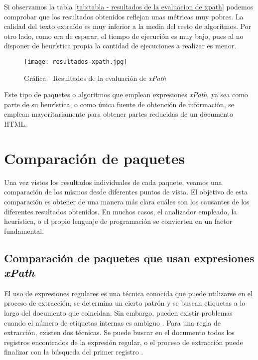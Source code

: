 Si observamos la tabla \ref{tab:tabla - resultados de la evaluacion de xpath} podemos comprobar que los
resultados obtenidos reflejan unas métricas muy pobres. La calidad del texto extraído es muy inferior a la
media del resto de algoritmos. Por otro lado, como era de esperar, el tiempo de ejecución es muy bajo, pues
al no disponer de heurística propia la cantidad de ejecuciones a realizar es menor.

\begin{figure}[tphb]
    \centering
    \texttt{[image: resultados-xpath.jpg]}
    \caption{Gráfica - Resultados de la evaluación de \emph{xPath}}
    \label{img:grafica - resultados de la evaluacion de xpath}
\end{figure}

Este tipo de paquetes o algoritmos que emplean expresiones \emph{xPath}, ya sea como parte de su heurística,
o como única fuente de obtención de información, se emplean mayoritariamente para obtener partes reducidas
de un documento HTML.

\section{Comparación de paquetes}
\label{sec:comparacion de paquetes}

Una vez vistos los resultados individuales de cada paquete, veamos una comparación de los mismos desde
diferentes puntos de vista. El objetivo de esta comparación es obtener de una manera más clara cuáles son
los causantes de los diferentes resultados obtenidos. En muchos casos, el analizador empleado, la heurística,
o el propio lenguaje de programación se convierten en un factor fundamental.

\subsection{Comparación de paquetes que usan expresiones \emph{xPath}}
\label{subsec:comparacion de paquetes que usan expresiones xpath}

El uso de expresiones regulares es una técnica conocida que puede utilizarse en el proceso de extracción,
se determina un cierto patrón y se buscan etiquetas a lo largo del documento que coincidan. Sin embargo,
pueden existir problemas cuando el número de etiquetas internas es ambiguo \cite{uzun}. Para una regla de 
extracción, existen dos técnicas. Se puede buscar en el documento todos los registros encontrados de la 
expresión regular, o el proceso de extracción puede finalizar con la búsqueda del primer registro \cite{regex}.

